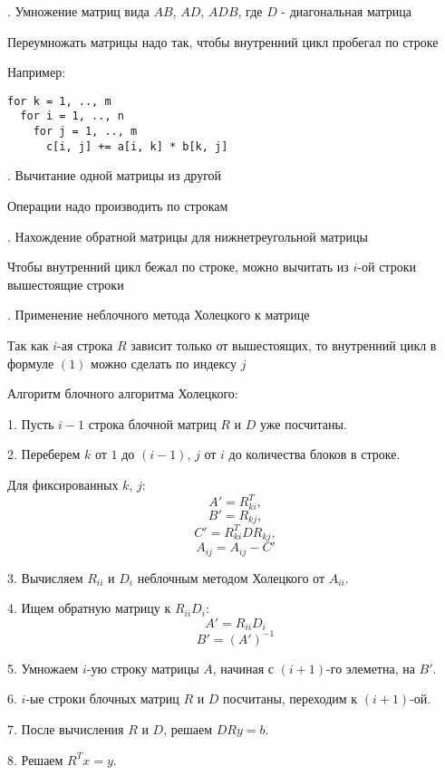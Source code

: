 \documentclass[12pt,a4paper]{article}
\begin{document}
\par\smallskip{}. Умножение матриц вида $AB$, $A D$, $A D B$, где $D$ - диагональная матрица
\par
Переумножать матрицы надо так, чтобы внутренний цикл пробегал по строке
\par
Например:
\begin{verbatim}
for k = 1, .., m
  for i = 1, .., n
    for j = 1, .., m
      c[i, j] += a[i, k] * b[k, j]
\end{verbatim}

\par\smallskip{}. Вычитание одной матрицы из другой
\par
Операции надо производить по строкам

\par\smallskip{}. Нахождение обратной матрицы для нижнетреугольной матрицы
\par
Чтобы внутренний цикл бежал по строке, можно вычитать из $i$-ой строки вышестоящие строки

\par\smallskip{}. Применение неблочного метода Холецкого к матрице
\par
Так как $i$-ая строка $R$ зависит только от вышестоящих, то внутренний цикл в формуле $(1)$ можно сделать по индексу $j$

\par\bigskip\noindent
Алгоритм блочного алгоритма Холецкого:
\par
1. Пусть $i-1$ строка блочной матриц $R$ и $D$ уже посчитаны. 
\par
2. Переберем $k$ от $1$ до $(i-1)$, $j$ от $i$ до количества блоков в строке.
\par
Для фиксированных $k$, $j$:
$$A' = R^T_{ki},$$ 
$$B' = R_{kj},$$ 
$$C' = R^T_{ki} D R_{kj},$$
$$A_{ij} = A_{ij} - C'$$
\par
3. Вычисляем $R_{ii}$ и $D_{i}$ неблочным методом Холецкого от $A_{ii}$.
\par
4. Ищем обратную матрицу к $R_{ii} D_i$: 
$$A' = R_{ii} D_i$$
$$B' = (A')^{-1}$$
\par
5. Умножаем $i$-ую строку матрицы $A$, начиная с $(i+1)$-го элеметна, на $B'$.
\par
6. $i$-ые строки блочных матриц $R$ и $D$ посчитаны, переходим к $(i+1)$-ой.
\par
7. После вычисления $R$ и $D$, решаем $D R y = b$.
\par
8. Решаем $R^T x = y$.
\end{document}
